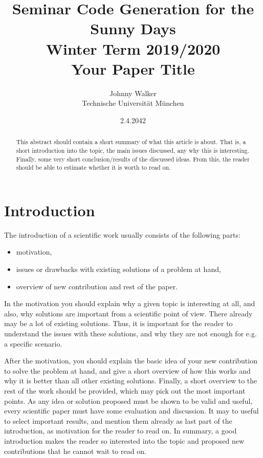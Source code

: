 \documentclass[twocolumn]{article}
\author{Johnny Walker \\ Technische Universit\"at M\"unchen}
\title{Seminar Code Generation for the Sunny Days \\
       Winter Term 2019/2020 \\
       {\bf Your Paper Title}
}
\date{2.4.2042}
\begin{document}
\maketitle

\begin{abstract}

This abstract should contain a short summary of what this
article is about. That is, a short introduction into the
topic, the main issues discussed, any why this is interesting.
Finally, some very short conclusion/results of the discussed
ideas. From this, the reader should be able to estimate whether
it is worth to read on.
\end{abstract}

\section{Introduction}

\label{introduction}

The introduction of a scientific work usually consists of the following
parts:
\begin{itemize}
	\item motivation,
	\item issues or drawbacks with existing solutions of a problem at hand,
	\item overview of new contribution and rest of the paper.
\end{itemize}
In the motivation you should explain why a given topic is interesting
at all, and also, why solutions are important from a scientific point
of view. There already may be a lot of existing solutions. Thus, it
is important for the reader to understand the issues with these solutions,
and why they are not enough for e.g. a specific scenario.

After the motivation, you should explain the basic idea of your new
contribution to solve the problem at hand, and give a short overview
of how this works and why it is better than all other existing solutions.
Finally, a short overview to the rest of the work should be provided,
which may pick out the most important points. As any idea or solution
proposed must be shown to be valid and useful, every scientific paper
must have some evaluation and discussion. It may to useful to select
important results, and mention them already as last part of the
introduction, as motivation for the reader to read on. In summary,
a good introduction makes the reader so interested into the topic and
proposed new contributions that he cannot wait to read on.
\end{document}
